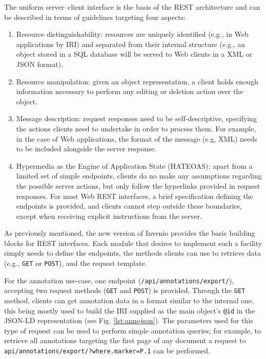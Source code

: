 \clearpage

The uniform server--client interface is the basis of the REST architecture and
can be described in terms of guidelines targeting four aspects:
\begin{enumerate}
  \item Resource distinguishability: resources are uniquely identified (e.g., in
                                     Web applications by IRI) and separated from
                                     their internal structure (e.g., an object
                                     stored in a SQL database will be served to
                                     Web clients in a XML or JSON format).
  \item Resource manipulation: given an object representation, a client holds
                               enough information necessary to perform any
                               editing or deletion action over the object.
  \item Message description: request responses need to be self-descriptive,
                             specifying the actions clients need to undertake in
                             order to process them. For example, in the case of
                             Web applications, the format of the message (e.g,
                             XML) needs to be included alongside the server
                             response.
  \item Hypermedia as the Engine of Application State (HATEOAS): apart from a
              limited set of simple endpoints, clients do no make any
              assumptions regarding the possible server actions, but only follow
              the hyperlinks provided in request responses. For most Web REST
              interfaces, a brief specification defining the endpoints is
              provided, and clients cannot step outside these boundaries,
              except when receiving explicit instructions from the server.
\end{enumerate}

As previously mentioned, the new version of Invenio provides the basic building
blocks for REST interfaces. Each module that desires to implement such a
facility simply needs to define the endpoints, the methods clients can use to
retrieve data (e.g., \texttt{GET} or \texttt{POST}), and the request template.

For the annotation use-case, one endpoint (\texttt{/api/annotations/export/}),
accepting two request methods (\texttt{GET} and \texttt{POST}) is provided.
Through the \texttt{GET} method, clients can get annotation data in a format
similar to the internal one, this being mostly used to build the IRI
supplied as the main object's \texttt{@id} in the JSON-LD representation (see
Fig. \ref{lst:annojson}). The parameters used for this type of request can be
used to perform simple annotation queries; for example, to retrieve all
annotations targeting the first page of any document a request to
\texttt{api/annotations/export/?where.marker=P.1} can be performed.

